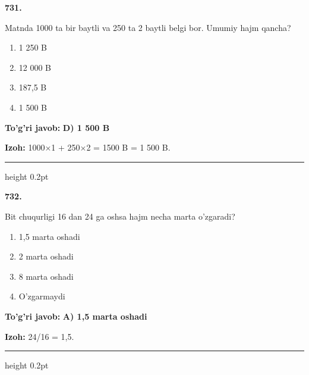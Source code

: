 \documentclass[10pt,a4paper,oneside]{article}
\begin{document}
\noindent\textbf{\color{ink}731.}
\par
Matnda 1000 ta bir baytli va 250 ta 2 baytli belgi bor. Umumiy hajm qancha?
\begin{enumerate}[label=\Alph*),leftmargin=9mm]
\item 1 250 B
\item 12 000 B
\item 187,5 B
\item 1 500 B
\end{enumerate}
\begin{tcolorbox}[enhanced,breakable,colback=teal!4,colframe=teal!50!black,boxrule=0.5pt,arc=1.1mm,left=3mm,right=3mm,top=1.7mm,bottom=1.7mm,before skip=2mm,after skip=2mm]
\textbf{\color{teal}To'g'ri javob:} \textbf{D) 1 500 B}
\par\smallskip
\textbf{Izoh:} 1000\ensuremath{\times}1 + 250\ensuremath{\times}2 = 1500 B = 1 500 B.
\end{tcolorbox}
\vspace{2mm}\hrule height 0.2pt \vspace{3mm}

\noindent\textbf{\color{ink}732.}
\par
Bit chuqurligi 16 dan 24 ga oshsa hajm necha marta o'zgaradi?
\begin{enumerate}[label=\Alph*),leftmargin=9mm]
\item 1,5 marta oshadi
\item 2 marta oshadi
\item 8 marta oshadi
\item O'zgarmaydi
\end{enumerate}
\begin{tcolorbox}[enhanced,breakable,colback=teal!4,colframe=teal!50!black,boxrule=0.5pt,arc=1.1mm,left=3mm,right=3mm,top=1.7mm,bottom=1.7mm,before skip=2mm,after skip=2mm]
\textbf{\color{teal}To'g'ri javob:} \textbf{A) 1,5 marta oshadi}
\par\smallskip
\textbf{Izoh:} 24/16 = 1,5.
\end{tcolorbox}
\vspace{2mm}\hrule height 0.2pt \vspace{3mm}
\end{document}
